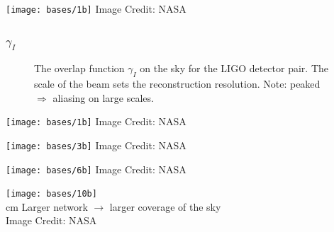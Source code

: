 {
\begin{frame}[plain]
\centering
\vskip 2cm
\texttt{[image: bases/1b]}
\vskip 2cm
\flushright
\tiny{\textcolor{white!50!black}{Image Credit: NASA}}

\end{frame}}


\begin{frame}

	\frametitle{$\gamma_I$}
    
	\begin{figure}
	\caption{The overlap function $\gamma_I$ on the sky for the LIGO detector pair. The scale of the beam sets the reconstruction resolution. Note: peaked $\Rightarrow$ aliasing on large scales.}
	\end{figure}
    \smallskip

\end{frame}

{
\begin{frame}[plain]
\centering
\vskip 2cm
\texttt{[image: bases/1b]}
\vskip 2cm
\flushright
\tiny{\textcolor{white!50!black}{Image Credit: NASA}}

\end{frame}


\begin{frame}[plain]
\centering
\vskip 2cm
\texttt{[image: bases/3b]}
\vskip 2cm
\flushright
\tiny{\textcolor{white!50!black}{Image Credit: NASA}}

\end{frame}

\begin{frame}[plain]
\centering
\vskip 2cm
\texttt{[image: bases/6b]}
\vskip 2cm
\flushright
\tiny{\textcolor{white!50!black}{Image Credit: NASA}}

\end{frame}
\begin{frame}[plain]
\vskip 2cm
\centering
\texttt{[image: bases/10b]}\\
 cm
Larger network $\rightarrow$ larger coverage of the sky\\
\flushright
\tiny{\textcolor{white!50!black}{Image Credit: NASA}}

\end{frame}
}

